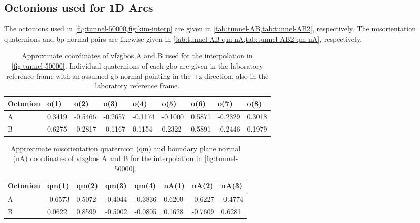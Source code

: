 \documentclass[preprint,12pt]{elsarticle}
\begin{document}
\subsection{Octonions used for 1D Arcs}
The octonions used in \cref{fig:tunnel-50000,fig:kim-interp} are given in \cref{tab:tunnel-AB,tab:tunnel-AB2}, respectively. The misorientation quaternions and \gls{bp} normal pairs are likewise given in \cref{tab:tunnel-AB-qm-nA,tab:tunnel-AB2-qm-nA}, respectively.
\begin{table}[]
\centering
\caption{Approximate coordinates of \glspl{vfzgbo} A and B used for the interpolation in \cref{fig:tunnel-50000}. Individual quaternions of each \gls{gbo} are given in the laboratory reference frame with an assumed \gls{gb} normal pointing in the +z direction, also in the laboratory reference frame.}
\label{tab:tunnel-AB}
\begin{tabular}{@{}lllllllll@{}}
\toprule
Octonion & o(1)   & o(2)    & o(3)    & o(4)    & o(5)    & o(6)   & o(7)    & o(8)   \\ \midrule
A        & 0.3419 & -0.5466 & -0.2657 & -0.1174 & -0.1000 & 0.5871 & -0.2329 & 0.3018 \\
B        & 0.6275 & -0.2817 & -0.1167 & 0.1154 & 0.2322 & 0.5891 & -0.2446 & 0.1979 \\ \bottomrule
\end{tabular}
\end{table}

\begin{table}[]
\centering
\caption{Approximate misorientation quaternion (qm) and boundary plane normal (nA) coordinates of \glspl{vfzgbo} A and B for the interpolation in \cref{fig:tunnel-50000}. }
\label{tab:tunnel-AB-qm-nA}
\begin{tabular}{@{}llllllll@{}}
\toprule
Octonion & qm(1) & qm(2) & qm(3) & qm(4) & nA(1) & nA(2) & nA(3) \\ \midrule
A & -0.6573 & 0.5072 & -0.4044 & -0.3836 & 0.6200 & -0.6227 & -0.4774 \\
B & 0.0622 & 0.8599 & -0.5002 & -0.0805 & 0.1628 & -0.7609 & 0.6281 \\ \bottomrule
\end{tabular}
\end{table}
\end{document}
